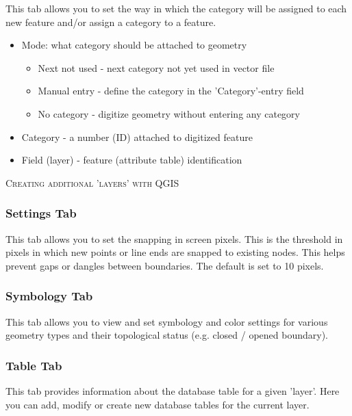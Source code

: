 This tab allows you to set the way in which the category will be assigned to
each new feature and/or assign a category to a feature.

\begin{itemize}
\item Mode: what category should be attached to geometry
\begin{itemize}
\item Next not used - next category not yet used in vector file
\item Manual entry - define the category in the 'Category'-entry field
\item No category - digitize geometry without entering any category
\end{itemize}
\item Category - a number (ID) attached to digitized feature
\item Field (layer) - feature (attribute table) identification
\end{itemize}

\begin{Tip}\caption{\textsc{Creating additional 'layers' with QGIS}}
\end{Tip}

\subsubsection{Settings Tab}\label{label_settingtab}

This tab allows you to set the snapping in screen pixels. This is the threshold
in pixels in which new points or line ends are snapped to existing nodes. This
helps prevent gaps or dangles between boundaries. The default is set to 10 
pixels.

\subsubsection{Symbology Tab}

This tab allows you to view and set symbology and color settings for various geometry types and
their topological status (e.g. closed / opened boundary).

\subsubsection{Table Tab} 
This tab provides information about the database table for
a given 'layer'. Here you can add, modify or create new database tables for the
current layer.

